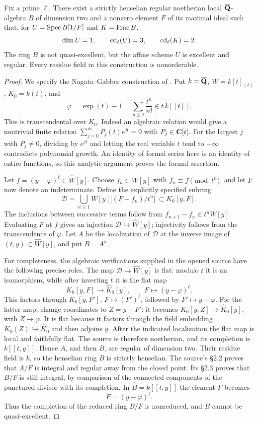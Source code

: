 \begin{theorem}
\label{A:nagata}
Fix a prime $\ell$. There exist a strictly henselian regular noetherian local $\overline{\mathbf Q}$-algebra $B$ of dimension two and a nonzero element $F$ of its maximal ideal such that, for $U=\operatorname{Spec} B[1/F]$ and $K=\operatorname{Frac} B$,
\[
\dim U=1,\qquad \operatorname{cd}_\ell(U)=3,\qquad \operatorname{cd}_\ell(K)=2.
\]
The ring $B$ is not quasi-excellent, but the affine scheme $U$ is excellent and regular. Every residue field in this construction is nonorderable.
\end{theorem}
\begin{proof}
We specify the Nagata--Gabber construction of \citet[Exposé XVIII$_B$, \S2, pp.~464--467]{A_ILO2014}. Put $k=\overline{\mathbf Q}$, $W=k[t]_{(t)}$, $K_0=k(t)$, and
\[
\varphi=\exp(t)-1=\sum_{n\geq1}\frac{t^n}{n!}\in t\,k[[t]].
\]
This is transcendental over $K_0$. Indeed an algebraic relation would give a nontrivial finite relation $\sum_{j=0}^m P_j(t)e^{jt}=0$ with $P_j\in\mathbf C[t]$. For the largest $j$ with $P_j\neq0$, dividing by $e^{jt}$ and letting the real variable $t$ tend to $+\infty$ contradicts polynomial growth. An identity of formal series here is an identity of entire functions, so this analytic argument proves the formal assertion.

Let $f=(y-\varphi)^\ell\in\widehat W[y]$. Choose $f_n\in W[y]$ with $f_n\equiv f\pmod{t^n}$, and let $F$ now denote an indeterminate. Define the explicitly specified subring
\[
\mathcal D=
\bigcup_{n\geq1}W[y]\bigl[(F-f_n)/t^n\bigr]
\ \subset K_0[y,F].
\]
The inclusions between successive terms follow from $f_{n+1}-f_n\in t^nW[y]$. Evaluating $F$ at $f$ gives an injection $\mathcal D\hookrightarrow\widehat W[y]$; injectivity follows from the transcendence of $\varphi$. Let $A$ be the localization of $\mathcal D$ at the inverse image of $(t,y)\subset\widehat W[y]$, and put $B=A^h$.

For completeness, the algebraic verifications supplied in the opened source have the following precise roles. The map $\mathcal D\to\widehat W[y]$ is flat: modulo $t$ it is an isomorphism, while after inverting $t$ it is the flat map
\[
K_0[y,F]\longrightarrow\widehat K_0[y],\qquad
F\longmapsto(y-\varphi)^\ell.
\]
This factors through $K_0[y,F']$, $F\mapsto(F')^\ell$, followed by $F'\mapsto y-\varphi$. For the latter map, change coordinates to $Z=y-F'$: it becomes $K_0[y,Z]\to\widehat K_0[y]$, with $Z\mapsto\varphi$. It is flat because it factors through the field embedding $K_0(Z)\hookrightarrow\widehat K_0$ and then adjoins $y$. After the indicated localization the flat map is local and faithfully flat. The source is therefore noetherian, and its completion is $k[[t,y]]$. Hence $A$, and then $B$, are regular of dimension two. Their residue field is $k$, so the henselian ring $B$ is strictly henselian. The source's \S2.2 proves that $A/F$ is integral and regular away from the closed point. Its \S2.3 proves that $B/F$ is still integral, by comparison of the connected components of the punctured divisor with its completion. In $\widehat B=k[[t,y]]$ the element $F$ becomes
\[
F=(y-\varphi)^\ell.
\]
Thus the completion of the reduced ring $B/F$ is nonreduced, and $B$ cannot be quasi-excellent.


\end{proof}
